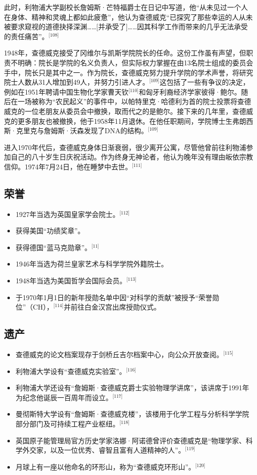 此时，利物浦大学副校长詹姆斯·芒特福爵士在日记中写道，他“从未见过一个人在身体、精神和灵魂上都如此疲惫”，他认为查德威克“已探究了那些幸运的人从未被要求窥视的道德抉择深渊……[并承受了]……因其科学工作而带来的几乎无法承受的责任痛苦”。\(^\text{[108]}\)

1948年，查德威克接受了冈维尔与凯斯学院院长的任命。这份工作虽有声望，但职责不明确：院长是学院的名义负责人，但实际权力掌握在由13名院士组成的委员会手中，院长只是其中之一。作为院长，查德威克努力提升学院的学术声誉，将研究院士人数从31人增加到49人，并努力引进人才。\(^\text{[109]}\)这包括了一些有争议的决定，例如在1951年聘请中国生物化学家曹天钦\(^\text{[110]}\)和匈牙利裔经济学家彼得·鲍尔。随后在一场被称为“农民起义”的事件中，以帕特里克·哈德利为首的院士投票将查德威克的一位老朋友从委员会中撤换，取而代之的是鲍尔。接下来的几年里，查德威克的更多朋友也被撤换，他于1958年11月退休。在他任职期间，学院博士生弗朗西斯·克里克与詹姆斯·沃森发现了DNA的结构。\(^\text{[109]}\)

进入1970年代后，查德威克身体日渐衰弱，很少离开公寓，尽管他曾前往利物浦参加自己的八十岁生日庆祝活动。作为终身无神论者，他认为晚年没有理由皈依宗教信仰。1974年7月24日，他在睡梦中去世。\(^\text{[111]}\)
\subsection{荣誉}
\begin{itemize}
\item 1927年当选为英国皇家学会院士。\(^\text{[112]}\)
\item 获得美国“功绩奖章”。
\item 获得德国“蓝马克勋章”。\(^\text{[11]}\)
\item 1946年当选为荷兰皇家艺术与科学学院外籍院士。
\item 1948年当选为美国哲学会国际会员。\(^\text{[113]}\)
\item 于1970年1月1日的新年授勋名单中因“对科学的贡献”被授予“荣誉勋位”（CH），\(^\text{[114]}\)并前往白金汉宫出席授勋仪式。
\end{itemize}
\subsection{遗产}
\begin{itemize}
\item 查德威克的论文档案现存于剑桥丘吉尔档案中心，向公众开放查阅。\(^\text{[115]}\)
\item 利物浦大学设有“查德威克实验室”。\(^\text{[116]}\)
\item 利物浦大学还设有“詹姆斯·查德威克爵士实验物理学讲席”，该讲席于1991年为纪念他诞辰一百周年而设立。\(^\text{[117]}\)
\item 曼彻斯特大学设有“詹姆斯·查德威克楼”，该楼用于化学工程与分析科学学院部分部门及可持续工程产业枢纽。\(^\text{[118]}\)
\item 英国原子能管理局官方历史学家洛娜·阿诺德曾评价查德威克是“物理学家、科学外交家，以及一位优秀、睿智且富有人道精神的人”。\(^\text{[119]}\)
\item 月球上有一座以他命名的环形山，称为“查德威克环形山”。\(^\text{[120]}\)
\end{itemize}
